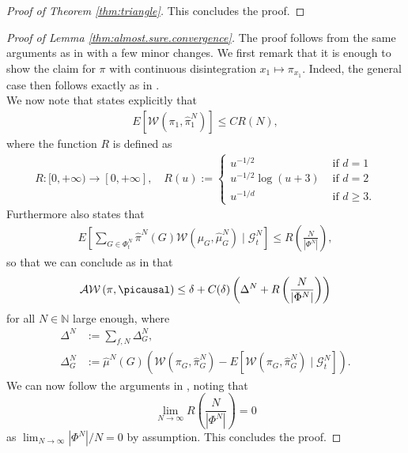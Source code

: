 \documentclass[10pt]{amsart}
\newcommand{\N}{\mathbb{N}}
\begin{document}
\begin{appendix}
\begin{proof}[Proof of Theorem \ref{thm:triangle}]
This concludes the proof.
\end{proof}


\begin{proof}[Proof of Lemma \ref{thm:almost.sure.convergence}]
The proof follows from the same arguments as in \cite[Proof of Theorem 1.3]{backhoff2020estimating} with a few minor changes. We first remark that it is enough to show the claim for $\pi$ with  continuous disintegration $x_1\mapsto \pi_{x_1}$. Indeed, the general case then follows exactly as in \cite[Proof of Theorem 1.3]{backhoff2020estimating}.\\
We now note that \cite[Proof of Lemma 3.4]{backhoff2020estimating} states explicitly that
\begin{align*}
E\left[\mathcal{W}\left(\pi_{1}, \widehat{\pi}_{1}^{N}\right)\right] \leq C R(N), 
\end{align*}
where the function $R$ is defined as
\begin{align*}
R:[0,+\infty) \rightarrow[0,+\infty], \quad R(u):=\left\{\begin{array}{ll}
u^{-1 / 2} & \text { if } d=1 \\
u^{-1 / 2} \log (u+3) & \text { if } d=2 \\
u^{-1 / d} & \text { if } d \geq 3.
\end{array}\right.
\end{align*}
Furthermore \cite[Proof of Lemma 3.4]{backhoff2020estimating} also states that
\begin{align*}
E\left[\sum_{G \in \Phi_{t}^{N}} \widehat{\pi}^{N}(G) \mathcal{W}\left(\mu_{G}, \widehat{\mu}_{G}^{N}\right) \mid \mathcal{G}_{t}^{N}\right]\leq R\left(\frac{N}{\left|\Phi^{N}\right|}\right),
\end{align*}
so that we can conclude as in \cite[Proof of Lemma 5.3]{backhoff2020estimating} that
\begin{align*}
\mathcal{A} \mathcal{W}\left(\pi, \picausal\right) \leq \delta+ C(\delta) \left( \Delta^N+ R\left(\frac{N}{\left|\Phi^{N}\right|}\right)\right)
\end{align*}
for all $N\in \N$ large enough,
where
\begin{align*}
\Delta^{N}&:=\sum_{f, N} \Delta_{ G}^{N}, \\
\Delta_{G}^{N}&:=\widehat{\mu}^{N}(G)\left(\mathcal{W}\left(\pi_{G}, \widehat{\pi}_{G}^{N}\right)-E\left[\mathcal{W}\left(\pi_{G},\widehat{\pi}_{G}^{N}\right) \mid \mathcal{G}_{t}^{N}\right]\right).
\end{align*}
We can now follow the arguments in  \cite[Proof of Theorem 5.3]{backhoff2020estimating}, noting that $$\lim_{N\to \infty}R\left(\frac{N}{\left|\Phi^{N}\right|}\right)=0$$ as $\lim_{N\to \infty} |\Phi^N|/N=0$ by assumption. This concludes the proof.
\end{proof}


\end{appendix}
\end{document}
